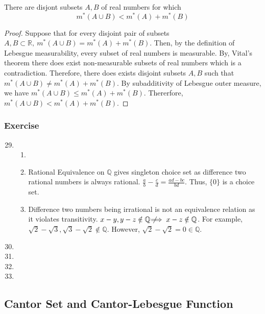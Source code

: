 \begin{theorem}
	There are disjont subsets $A,B$ of real numbers for which
	\begin{equation}
		m^\ast(A \cup B) < m^\ast(A) + m^\ast(B)
	\end{equation}
\end{theorem}
\begin{proof}
	Suppose that for every disjoint pair of subsets $A,B \subset \mathbb{R},\ m^\ast(A \cup B) = m^\ast(A) + m^\ast(B)$.
	Then, by the definition of Lebesgue measurability, every subset of real numbers is measurable.
	By, Vital's theorem there does exist non-measurable subsets of real numbers which is a contradiction.
	Therefore, there does exists disjoint subsets $A,B$ such that $m^\ast(A \cup B) \ne m^\ast(A) + m^\ast(B)$.
	By subadditivity of Lebesgue outer measure, we have $m^\ast(A \cup B) \le m^\ast(A) + m^\ast(B)$.
	Thererfore, $m^\ast(A \cup B) < m^\ast(A)+ m^\ast(B)$.
\end{proof}

\subsubsection{Exercise}
\begin{enumerate}
	\setcounter{enumi}{28}
	\item
	\begin{enumerate}
		\item
		\item Rational Equivalence on $\mathbb{Q}$ gives singleton choice set as difference two rational numbers is always rational. $\frac{a}{b} - \frac{c}{d} = \frac{ad-bc}{bd}$. Thus, $\{ 0 \}$ is a choice set.
		\item Difference two numbers being irrational is not an equivalence relation as it violates transitivity.
		$x - y, y-z \notin \mathbb{Q} \not\!\!\!\implies x-z \notin \mathbb{Q}$.
		For example, $\sqrt{2} - \sqrt{3}, \sqrt{3} - \sqrt{2}  \not\in \mathbb{Q}$.
		However, $\sqrt{2} - \sqrt{2} = 0 \in \mathbb{Q}$.
		\end{enumerate}
	\item
	\item
	\item
	\item
\end{enumerate}

\subsection{Cantor Set and Cantor-Lebesgue Function}

